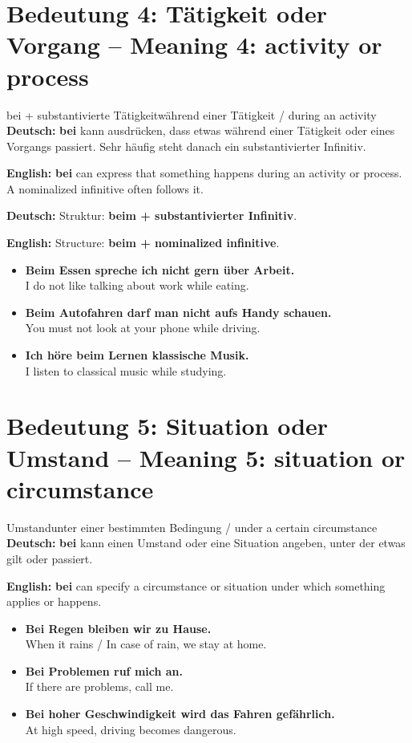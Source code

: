 \documentclass[a4paper,11pt]{article}
\newcommand{\GermanText}[1]{\textbf{Deutsch: }#1\par}
\newcommand{\EnglishText}[1]{{\small\color{SoftGray}\textbf{English: }#1\par}}
\newcommand{\ExampleItem}[2]{\item \textbf{#1}\\{\small\color{SoftGray}#2}}
\begin{document}
\section{Bedeutung 4: Tätigkeit oder Vorgang -- Meaning 4: activity or process}
\begin{grammarentry}{bei + substantivierte Tätigkeit}{während einer Tätigkeit / during an activity}
\GermanText{\textbf{bei} kann ausdrücken, dass etwas während einer Tätigkeit oder eines Vorgangs passiert. Sehr häufig steht danach ein substantivierter Infinitiv.}
\EnglishText{\textbf{bei} can express that something happens during an activity or process. A nominalized infinitive often follows it.}
\GermanText{Struktur: \textbf{beim + substantivierter Infinitiv}.}
\EnglishText{Structure: \textbf{beim + nominalized infinitive}.}
\end{grammarentry}
\begin{exbox}\begin{itemize}
\ExampleItem{Beim Essen spreche ich nicht gern über Arbeit.}{I do not like talking about work while eating.}
\ExampleItem{Beim Autofahren darf man nicht aufs Handy schauen.}{You must not look at your phone while driving.}
\ExampleItem{Ich höre beim Lernen klassische Musik.}{I listen to classical music while studying.}
\end{itemize}\end{exbox}

\section{Bedeutung 5: Situation oder Umstand -- Meaning 5: situation or circumstance}
\begin{grammarentry}{Umstand}{unter einer bestimmten Bedingung / under a certain circumstance}
\GermanText{\textbf{bei} kann einen Umstand oder eine Situation angeben, unter der etwas gilt oder passiert.}
\EnglishText{\textbf{bei} can specify a circumstance or situation under which something applies or happens.}
\end{grammarentry}
\begin{exbox}\begin{itemize}
\ExampleItem{Bei Regen bleiben wir zu Hause.}{When it rains / In case of rain, we stay at home.}
\ExampleItem{Bei Problemen ruf mich an.}{If there are problems, call me.}
\ExampleItem{Bei hoher Geschwindigkeit wird das Fahren gefährlich.}{At high speed, driving becomes dangerous.}
\end{itemize}\end{exbox}
\end{document}
